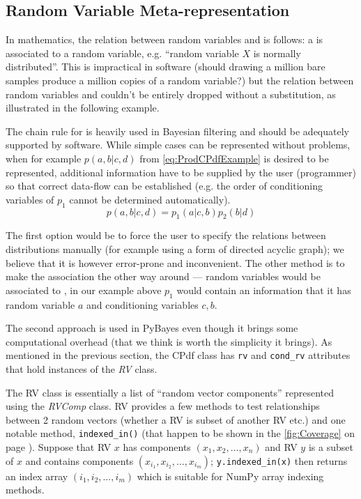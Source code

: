 \subsection{Random Variable Meta-representation}

In mathematics, the relation between random variables and {\pdfs} is follows: a {\pdf} is associated
to a random variable, e.g. ``random variable \(X\) is normally distributed''. This is impractical in
software (should drawing a million bare samples produce a million copies of a random variable?) but
the relation between random variables and {\pdfs} couldn't be entirely dropped without a substitution,
as illustrated in the following example.

The chain rule for {\pdfs} is heavily used in Bayesian filtering and should be adequately supported
by software. While simple cases can be represented without problems, when for example \(p(a,b|c,d)\)
from \eqref{eq:ProdCPdfExample} is desired to be represented, additional information have to be supplied by
the user (programmer) so that correct data-flow can be established (e.g. the order of conditioning
variables of \(p_1\) cannot be determined automatically).
\begin{equation} \label{eq:ProdCPdfExample}
	p(a,b|c,d) = p_1(a|c,b) p_2(b|d)
\end{equation}

The first option would be to force the user to specify the relations between distributions manually
(for example using a form of directed acyclic graph); we believe that it is however error-prone
and inconvenient. The other method is to make the association the other way around --- random
variables would be associated to {\pdfs}, in our example above \(p_1\) would contain an information
that it has random variable \(a\) and conditioning variables \(c,b\).

The second approach is used in PyBayes even though it brings some computational overhead (that we
think is worth the simplicity it brings). As mentioned in the previous section, the CPdf class has
\verb|rv| and \verb|cond_rv| attributes that hold instances of the \emph{RV} class.

The RV class is essentially a list of ``random vector components'' represented using the
\emph{RVComp} class. RV provides a few methods to test relationships between 2 random vectors
(whether a RV is subset of another RV etc.) and one notable method, \verb|indexed_in()| (that happen
to be shown in the \autoref{fig:Coverage} on page \pageref{fig:Coverage}). Suppose
that RV \(x\) has components \((x_1, x_2, \dotsc, x_n)\) and RV \(y\) is a subset of \(x\) and contains
components \((x_{i_1}, x_{i_2}, \dotsc, x_{i_m})\); \verb|y.indexed_in(x)| then returns an index array
\((i_1, i_2, \dotsc, i_m)\) which is suitable for NumPy array indexing methods.

